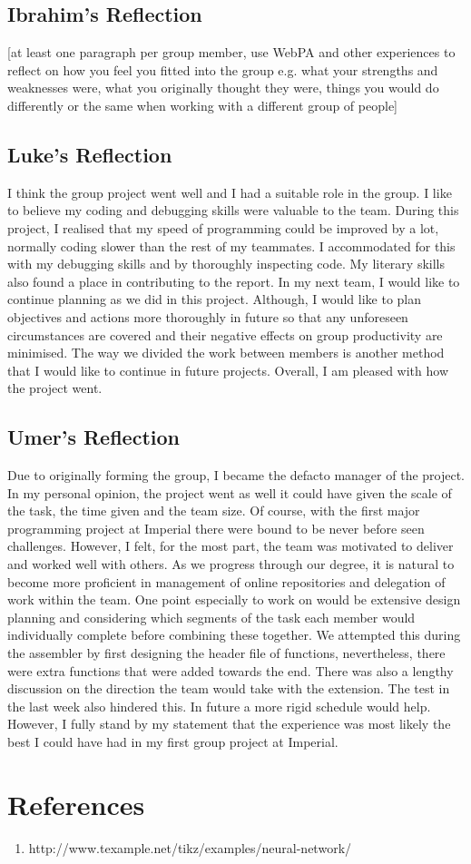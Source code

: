 \documentclass[11pt]{article}
\begin{document}
\subsection{Ibrahim's Reflection}
[at least one paragraph per group member, use WebPA and other experiences to reflect on how you feel you fitted into the group e.g. what your strengths and weaknesses were, what you originally thought they were, things you would do differently or the same when working with a different group of people]

\subsection{Luke's Reflection}
I think the group project went well and I had a suitable role in the group.
I like to believe my coding and debugging skills were valuable to the team.
During this project, I realised that my speed of programming could be improved by a lot,
normally coding slower than the rest of my teammates. I accommodated for this
with my debugging skills and by thoroughly inspecting code.
My literary skills also found a place in contributing to the report.
In my next team, I would like to continue planning as we did in this project.
Although, I would like to plan objectives and actions more thoroughly in future so that
any unforeseen circumstances are covered and their negative effects on group 
productivity are minimised. The way we divided the work between members is another
method that I would like to continue in future projects.
Overall, I am pleased with how the project went.

\subsection{Umer's Reflection}
Due to originally forming the group, I became the defacto manager of the project. In my personal opinion, the project went as well it could have given the scale of the task, the time given and the team size. Of course, with the first major programming project at Imperial there were bound to be never before seen challenges. However, I felt, for the most part, the team was motivated to deliver and worked well with others. As we progress through our degree, it is natural to become more proficient in management of online repositories and delegation of work within the team. One point especially to work on would be extensive design planning and considering which segments of the task each member would individually complete before combining these together. We attempted this during the assembler by first designing the header file of functions, nevertheless, there were extra functions that were added towards the end. There was also a lengthy discussion on the direction the team would take with the extension. The test in the last week also hindered this. In future a more rigid schedule would help. However, I fully stand by my statement that the experience was most likely the best I could have had in my first group project at Imperial. 

\section{References}
\begin{enumerate}
	\item http://www.texample.net/tikz/examples/neural-network/
\end{enumerate}
\end{document}

